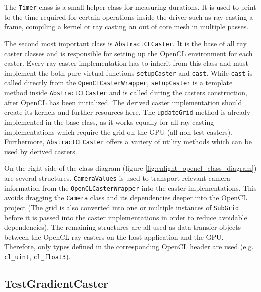 The \lstinline!Timer! class is a small helper class for measuring durations. It is used to print to the time required for certain operations inside the driver such as ray casting a frame, compiling a kernel or ray casting an out of core mesh in multiple passes.

The second most important class is \lstinline!AbstractCLCaster!. It is the base of all ray caster classes and is responsible for setting up the OpenCL environment for each caster. Every ray caster implementation has to inherit from this class and must implement the both pure virtual functions \lstinline!setupCaster! and \lstinline!cast!. While \lstinline!cast! is called directly from the \lstinline!OpenCLCasterWrapper!, \lstinline!setupCaster! is a template method inside \lstinline!AbstractCLCaster! and is called during the casters construction, after OpenCL has been initialized. The derived caster implementation should create its kernels and further resources here. The \lstinline!updateGrid! method is already implemented in the base class, as it works equally for all ray casting implementations which require the grid on the GPU (all non-test casters). Furthermore, \lstinline!AbstractCLCaster! offers a variety of utility methods which can be used by derived casters.

On the right side of the class diagram (figure \ref{fig:enlight_opencl_class_diagram}) are several structures. \lstinline!CameraValues! is used to transport relevant camera information from the \lstinline!OpenCLCasterWrapper! into the caster implementations. This avoids dragging the \lstinline!Camera! class and its dependencies deeper into the OpenCL project (The grid is also converted into one or multiple instances of \lstinline!SubGrid! before it is passed into the caster implementations in order to reduce avoidable dependencies). The remaining structures are all used as data transfer objects between the OpenCL ray casters on the host application and the GPU. Therefore, only types defined in the corresponding OpenCL header are used (e.g. \lstinline!cl_uint!, \lstinline!cl_float3!). 


\subsection{TestGradientCaster}

